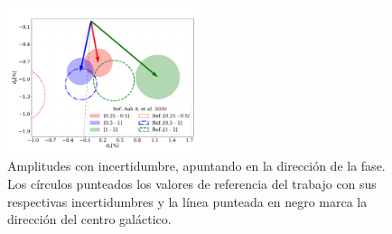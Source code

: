 \begin{figure}[H]
    \begin{small}
        \begin{center}
            \includegraphics[width=0.5\textwidth]{comparando_sigmas_v2.pdf}
        \end{center}
        \caption{Amplitudes con incertidumbre, apuntando en la dirección  de la fase. Los círculos punteados los valores de referencia del trabajo \cite{Aab_2020} con sus respectivas incertidumbres y la línea punteada en negro marca la dirección del centro galáctico.}
        \label{fig:incertidumbre}
    \end{small}
\end{figure}


    
    
    
    
